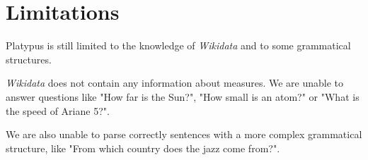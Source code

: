 \section{Limitations}

Platypus is still limited to the knowledge of \emph{Wikidata} and to some grammatical
structures.

\emph{Wikidata} does not contain any information about measures. We are unable
to answer questions like "How far is the Sun?", "How small is an atom?" or
"What is the speed of Ariane 5?".

We are also unable to parse correctly sentences with a more complex grammatical structure, like
"From which country does the jazz come from?".

